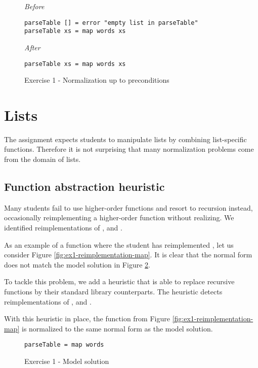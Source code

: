 \begin{figure}
\centering
\emph{Before}
\begin{verbatim}
parseTable [] = error "empty list in parseTable"
parseTable xs = map words xs
\end{verbatim}
\bigskip
\emph{After}
\begin{verbatim}
parseTable xs = map words xs
\end{verbatim}
\caption{Exercise 1 - Normalization up to preconditions}
\label{fig:preconditions-remove-base-case}
\end{figure}

\section{Lists}

The assignment expects students to manipulate lists by combining list-specific functions. Therefore it is not surprising that many normalization problems come from the domain of lists.

\subsection{Function abstraction heuristic}

Many students fail to use higher-order functions and resort to recursion instead, occasionally reimplementing a higher-order function without realizing. We identified reimplementations of ,  and .

As an example of a function where the student has reimplemented , let us consider Figure \ref{fig:ex1-reimplementation-map}.  It is clear that the normal form does not match the model solution in Figure \ref{fig:ex1-model-solution}.

To tackle this problem, we add a heuristic that is able to replace recursive functions by their standard library counterparts. The heuristic detects reimplementations of ,  and .

With this heuristic in place, the function from Figure \ref{fig:ex1-reimplementation-map} is normalized to the same normal form as the model solution.

\begin{figure}
\begin{verbatim}
parseTable = map words
\end{verbatim}
\caption{Exercise 1 - Model solution}
\label{fig:ex1-model-solution}
\end{figure}


